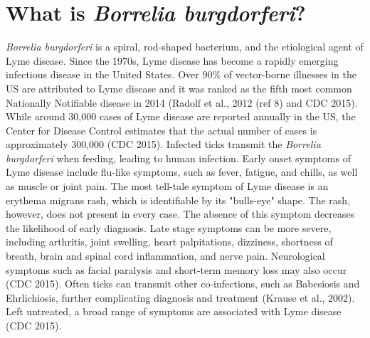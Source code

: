 \documentclass[12pt,twoside]{reedthesis}
\begin{document}
\section{What is \textit{Borrelia burgdorferi}?}
\newcommand{\FAstdfit}{r = $\frac{\Delta r \cdot P}{K_{d} + P }$ + $r_{min}$}
\newcommand{\micro}{$\mu$}


	\textit{Borrelia burgdorferi} is a spiral, rod-shaped bacterium, and the etiological agent of Lyme disease. Since the 1970s, Lyme disease has become a rapidly emerging infectious disease in the United States. Over 90\% of vector-borne illnesses in the US are attributed to Lyme disease and it was ranked as the fifth most common Nationally Notifiable disease in 2014 (Radolf et al., 2012 (ref 8) and CDC 2015). While around 30,000 cases of Lyme disease are reported annually in the US, the Center for Disease Control estimates that the actual  number of cases is approximately 300,000 (CDC 2015). Infected ticks transmit the \textit{Borrelia burgdorferi} when feeding, leading to human infection. Early onset symptoms of Lyme disease include flu-like symptoms, such as fever, fatigue, and chills, as well as muscle or joint pain. The most tell-tale symptom of Lyme disease is an erythema migrans rash, which is identifiable by its "bulls-eye" shape. The rash, however, does not present in every case. The absence of this symptom decreases the likelihood of early diagnosis. Late stage symptoms can be more severe, including arthritis, joint swelling, heart palpitations, dizziness, shortness of breath, brain and spinal cord inflammation, and nerve pain. Neurological symptoms such as facial paralysis and short-term memory loss may also occur (CDC 2015). Often ticks can transmit other co-infections, such as Babesiosis and Ehrlichiosis, further complicating diagnosis and treatment (Krause et al., 2002). Left untreated, a broad range of symptoms are associated with Lyme disease (CDC 2015). 
	
\end{document}
